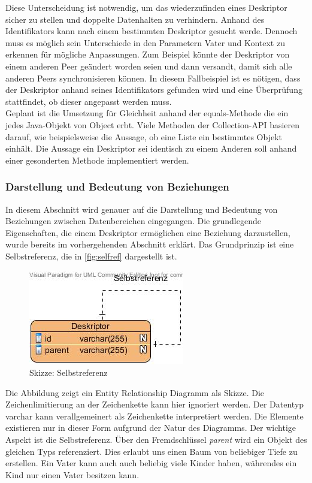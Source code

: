 \documentclass[a4paper]{article}
\begin{document}
	Diese Unterscheidung ist notwendig, um das wiederzufinden eines Deskriptor
	sicher zu stellen und doppelte Datenhalten zu verhindern.
	Anhand des Identifikators kann nach einem bestimmten Deskriptor gesucht werde. 
	Dennoch muss es möglich sein Unterschiede in den Parametern 
	Vater und Kontext zu erkennen für mögliche Anpassungen. Zum Beispiel könnte
	der Deskriptor von einem anderen Peer geändert worden seien und dann
	versandt, damit sich alle anderen Peers synchronisieren können. In diesem
	Fallbeispiel ist es nötigen, dass der Deskriptor anhand seines Identifikators
	gefunden wird und eine Überprüfung stattfindet, ob dieser angepasst werden
	muss. \\
	
	Geplant ist die Umsetzung für Gleichheit anhand der equals-Methode die ein
	jedes Java-Objekt von Object erbt. Viele Methoden der Collection-API basieren
	darauf, wie beispielsweise die Aussage, ob eine Liste ein bestimmtes Objekt
	einhält. Die Aussage ein Deskriptor sei identisch zu einem Anderen soll anhand
	einer gesonderten Methode implementiert werden.
	
	\subsubsection{Darstellung und Bedeutung von Beziehungen}
	
	In diesem Abschnitt wird genauer auf die Darstellung und Bedeutung von 
	Beziehungen zwischen Datenbereichen eingegangen. Die grundlegende
	Eigenschaften, die einem Deskriptor ermöglichen eine Beziehung darzustellen,
	wurde bereits im vorhergehenden Abschnitt erklärt. Das Grundprinzip ist eine
	Selbstreferenz, die in \autoref{fig:selfref} dargestellt ist.
	
	\begin{figure}[H] 
		\centerline{
			\includegraphics[scale=1]{../Bilder/selfref.jpg}
		}
		\caption{Skizze: Selbstreferenz}
		\label{fig:selfref}
	\end{figure}
	
	Die Abbildung zeigt ein Entity Relationship Diagramm als Skizze. Die 
	Zeichenlimitierung an der Zeichenkette kann hier ignoriert werden. Der Datentyp 	
	varchar kann verallgemeinert als Zeichenkette interpretiert werden. Die
	Elemente existieren nur in dieser Form aufgrund der Natur des Diagramms.
	Der wichtige Aspekt ist die Selbstreferenz. Über den Fremdschlüssel
	\emph{parent} wird ein Objekt des gleichen Typs referenziert. Dies erlaubt
	uns einen Baum von beliebiger Tiefe zu erstellen. Ein Vater kann auch
	auch beliebig viele Kinder haben, währendes ein Kind nur einen Vater besitzen
	kann. \\
	
\end{document}
